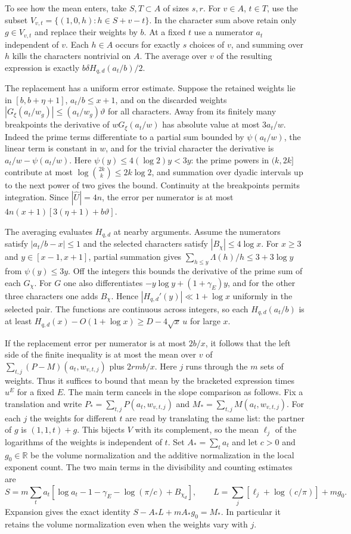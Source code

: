 \documentclass[11pt]{amsart}
\theoremstyle{definition}
\theoremstyle{remark}
\begin{document}
To see how the mean enters, take $S,T\subset A$ of sizes $s,r$.
For $v\in A$, $t\in T$, use the subset
$V_{v,t}=\{(1,0,h):h\in S+v-t\}$. In the character sum above
retain only $g\in V_{v,t}$ and replace their weights by $b$.
At a fixed $t$ use a numerator $a_t$ independent of $v$. Each
$h\in A$ occurs for exactly $s$ choices of $v$, and summing over
$h$ kills the characters nontrivial on $A$. The average over $v$
of the resulting expression is exactly
$b\delta H_{q,d}(a_t/b)/2$.

The replacement has a uniform error estimate. Suppose the retained
weights lie in $[b,b+\eta+1]$, $a_t/b\le x+1$, and on the
discarded weights $|G_\xi(a_t/w_g)|\le(a_t/w_g)\vartheta$ for
all characters. Away from its finitely many breakpoints the
derivative of $wG_\xi(a_t/w)$ has absolute value at most
$3a_t/w$. Indeed the prime terms differentiate to a partial sum
bounded by $\psi(a_t/w)$, the linear term is constant in $w$,
and for the trivial character the derivative is
$a_t/w-\psi(a_t/w)$. Here $\psi(y)\le 4(\log 2)y<3y$:
the prime powers in $(k,2k]$ contribute at most
$\log\binom{2k}{k}\le2k\log2$, and summation over dyadic
intervals up to the next power of two gives the bound.
Continuity at the breakpoints permits integration. Since
$|\widehat U|=4n$, the error per numerator is at most
$4n(x+1)[3(\eta+1)+b\vartheta]$.

The averaging evaluates $H_{q,d}$ at nearby arguments. Assume the
numerators satisfy $|a_t/b-x|\le1$ and the selected characters
satisfy $|B_\chi|\le4\log x$. For $x\ge3$ and
$y\in[x-1,x+1]$, partial summation gives
$\sum_{h\le y}\Lambda(h)/h\le3+3\log y$ from $\psi(y)\le3y$.
Off the integers this bounds the derivative of the prime sum of
each $G_\chi$. For $G$ one also differentiates
$-y\log y+(1+\gamma_E)y$, and for the other three characters
one adds $B_\chi$. Hence $|H_{q,d}'(y)|\ll1+\log x$ uniformly
in the selected pair. The functions are continuous across integers,
so each $H_{q,d}(a_t/b)$ is at least
$H_{q,d}(x)-O(1+\log x)\ge D-4\sqrt{x}\,u$ for large $x$.

If the replacement error per numerator is at most $2b/x$, it
follows that the left side of the finite inequality is at most
the mean over $v$ of $\sum_{t,j}(P-M)(a_t,w_{v,t,j})$ plus
$2rmb/x$. Here $j$ runs through the $m$ sets of weights.
Thus it suffices to bound that mean by the bracketed expression
times $u^E$ for a fixed $E$. The main term cancels in the slope comparison as follows.
Fix a translation and write $P_* = \sum_{t,j}P(a_t,w_{v,t,j})$
and $M_* = \sum_{t,j}M(a_t,w_{v,t,j})$. For each $j$ the
weights for different $t$ are read by translating the same list:
the partner of $g$ is $(1,1,t)+g$. This bijects $V$ with its
complement, so the mean $\ell_j$ of the logarithms of the weights
is independent of $t$. Set $A_*=\sum_t a_t$ and let $c>0$ and
$g_0\in\mathbb R$ be the volume normalization and the additive
normalization in the local exponent count. The two main terms in
the divisibility and counting estimates are
\[
 S=m\sum_t a_t[\log a_t-1-\gamma_E-\log(\pi/c)+B_{\chi_d}],
 \qquad L=\sum_j[\ell_j+\log(c/\pi)]+m g_0.
\]
Expansion gives the exact identity
$S-A_*L+mA_*g_0=M_*$. In particular it retains the volume
normalization even when the weights vary with $j$.
\end{document}
